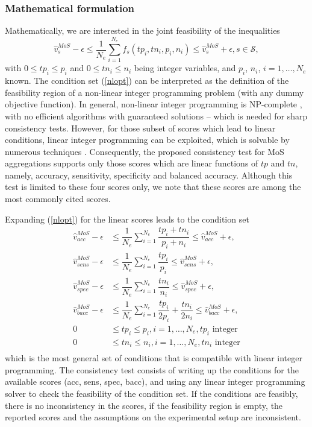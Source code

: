 \documentclass[5p, final]{elsarticle}
\begin{document}
\subsubsection{Mathematical formulation}

Mathematically, we are interested in the joint feasibility of the inequalities
\begin{equation}
\label{nlopt}
\hat{v}_s^{MoS} - \epsilon \leq \dfrac{1}{N_e}\sum\limits_{i=1}^{N_e} f_s(tp_i, tn_i, p_i, n_i) \leq \hat{v}_s^{MoS} + \epsilon, s\in\mathcal{S},
\end{equation}
with $0 \leq tp_i \leq p_i$ and $0\leq tn_i \leq n_i$ being integer variables, and $p_i$, $n_i$, $i=1,\dots,N_e$ known. The condition set (\ref{nlopt}) can be interpreted as the definition of the feasibility region of a non-linear integer programming problem (with any dummy objective function). In general, non-linear integer programming is NP-complete \cite{ip}, with no efficient algorithms with guaranteed solutions -- which is needed for sharp consistency tests. However, for those subset of scores which lead to linear conditions, linear integer programming can be exploited, which is solvable by numerous techniques \cite{ip}. Consequently, the proposed consistency test for MoS aggregations supports only those scores which are linear functions of $tp$ and $tn$, namely, accuracy, sensitivity, specificity and balanced accuracy. Although this test is limited to these four scores only, we note that these scores are among the most commonly cited scores.

Expanding (\ref{nlopt}) for the linear scores leads to the condition set
\begin{align}
\label{aggtest}
\hat{v}_{acc}^{MoS} - \epsilon & \leq \dfrac{1}{N_e} \sum\limits_{i=1}^{N_e} \dfrac{tp_i + tn_i}{p_i + n_i} \leq \hat{v}_{acc}^{MoS} + \epsilon, \nonumber \\
\hat{v}_{sens}^{MoS} - \epsilon & \leq \dfrac{1}{N_e} \sum\limits_{i=1}^{N_e} \dfrac{tp_i}{p_i} \leq \hat{v}_{sens}^{MoS} + \epsilon, \nonumber \\
\hat{v}_{spec}^{MoS} - \epsilon & \leq \dfrac{1}{N_e} \sum\limits_{i=1}^{N_e} \dfrac{tn_i}{n_i} \leq \hat{v}_{spec}^{MoS} + \epsilon, \nonumber \\
\hat{v}_{bacc}^{MoS} - \epsilon & \leq \dfrac{1}{N_e} \sum\limits_{i=1}^{N_e} \dfrac{tp_i}{2p_i} + \dfrac{tn_i}{2n_i} \leq \hat{v}_{bacc}^{MoS} + \epsilon, \nonumber \\
0 &\leq tp_i \leq p_i, i=1,\dots,N_e, tp_i \text{ integer}\nonumber \\
0 &\leq tn_i \leq n_i, i=1,\dots,N_e, tn_i \text{ integer}\\
\end{align}
which is the most general set of conditions that is compatible with linear integer programming. The consistency test consists of writing up the conditions for the available scores (acc, sens, spec, bacc), and using any linear integer programming solver to check the feasibility of the condition set. If the conditions are feasibly, there is no inconsistency in the scores, if the feasibility region is empty, the reported scores and the assumptions on the experimental setup are inconsistent.
\end{document}
